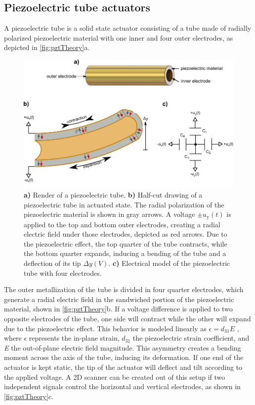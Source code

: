 \documentclass[10pt]{iopart}
\begin{document}
\subsection{Piezoelectric tube actuators}
\label{ssec:piezo}
A piezoelectric tube is a solid state actuator consisting of a tube made of radially polarized piezoelectric material with one inner and four outer electrodes, as depicted in \autoref{fig:pztTheory}a. 
\begin{figure}[h!]
      \centering
      \includegraphics[width=\columnwidth]{figures/pztTheory.pdf}
      \caption{	\textbf{a)} Render of a piezoelectric tube.
      			\textbf{b)} Half-cut drawing of a piezoelectric tube in actuated state. The radial polarization of the piezoelectric material is shown in gray arrows. A voltage $\pm u_\mathrm{y}(t)$ is applied to the top and bottom outer electrodes, creating a radial electric field under those electrodes, depicted as red arrows. Due to the piezoelectric effect, the top quarter of the tube contracts, while the bottom quarter expands, inducing a bending of the tube and a deflection of its tip $\Delta y(V)$.
      			\textbf{c)} Electrical model of the piezoelectric tube with four electrodes.}
      \label{fig:pztTheory}
\end{figure}
The outer metallization of the tube is divided in four quarter electrodes, which generate a radial electric field in the sandwiched portion of the piezoelectric material, shown in \autoref{fig:pztTheory}b. If a voltage difference is applied to two opposite electrodes of the tube, one side will contract while the other will expand due to the piezoelectric effect. This behavior is modeled linearly  as $\epsilon = d_{31} E$ \cite{Arnau2008}, where $\epsilon$ represents the in-plane strain, $d_{31}$ the piezoelectric strain coefficient, and \textit{E} the out-of-plane electric field magnitude. This asymmetry creates a bending moment across the axis of the tube, inducing its deformation. If one end of the actuator is kept static, the tip of the actuator will deflect and tilt according to the applied voltage. A 2D scanner can be created out of this setup if two independent signals control the horizontal and vertical electrodes, as shown in \autoref{fig:pztTheory}c.
\end{document}
